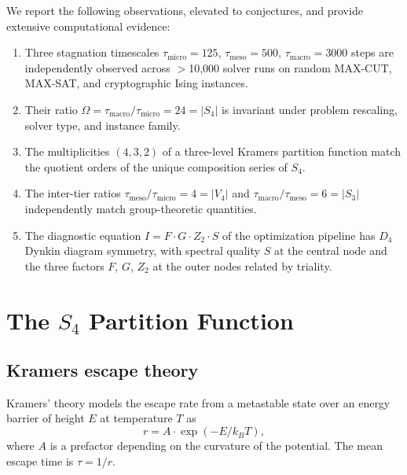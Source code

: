 \documentclass[11pt]{amsart}
\theoremstyle{definition}
\begin{document}
We report the following observations, elevated to conjectures, and provide extensive computational evidence:

\begin{enumerate}[label=(\arabic*)]
\item Three stagnation timescales $\tau_{\mathrm{micro}} = 125$, $\tau_{\mathrm{meso}} = 500$, $\tau_{\mathrm{macro}} = 3000$ steps are independently observed across $>$10{,}000 solver runs on random MAX-CUT, MAX-SAT, and cryptographic Ising instances.
\item Their ratio $\Omega = \tau_{\mathrm{macro}} / \tau_{\mathrm{micro}} = 24 = |S_4|$ is invariant under problem rescaling, solver type, and instance family.
\item The multiplicities $(4, 3, 2)$ of a three-level Kramers partition function match the quotient orders of the unique composition series of $S_4$.
\item The inter-tier ratios $\tau_{\mathrm{meso}}/\tau_{\mathrm{micro}} = 4 = |V_4|$ and $\tau_{\mathrm{macro}}/\tau_{\mathrm{meso}} = 6 = |S_3|$ independently match group-theoretic quantities.
\item The diagnostic equation $I = F \cdot G \cdot Z_2 \cdot S$ of the optimization pipeline has $D_4$ Dynkin diagram symmetry, with spectral quality $S$ at the central node and the three factors $F$, $G$, $Z_2$ at the outer nodes related by triality.
\end{enumerate}


\section{The $S_4$ Partition Function}
\label{sec:partition}

\subsection{Kramers escape theory}

Kramers' theory \cite{kramers1940} models the escape rate from a metastable state over an energy barrier of height $E$ at temperature $T$ as
\begin{equation}\label{eq:kramers}
r = A \cdot \exp(-E / k_B T),
\end{equation}
where $A$ is a prefactor depending on the curvature of the potential. The mean escape time is $\tau = 1/r$.
\end{document}

